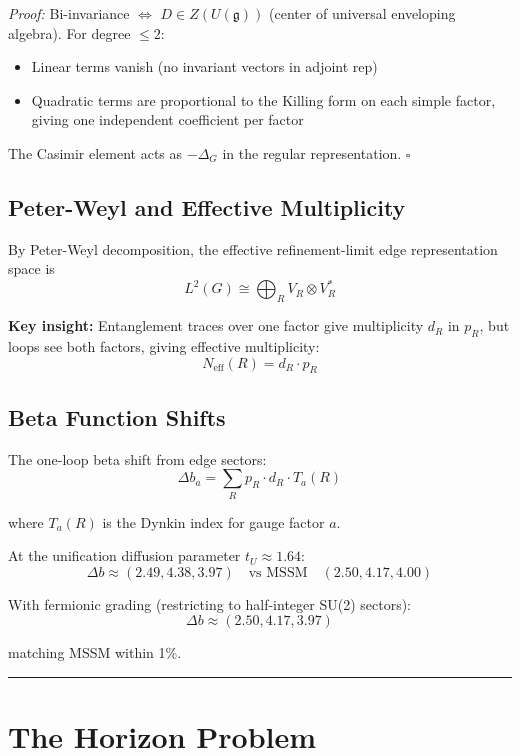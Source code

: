 \emph{Proof:} Bi-invariance \(\Leftrightarrow\) \(D \in Z(U(\mathfrak{g}))\) (center of universal enveloping algebra). For degree \(\leq 2\):

\begin{itemize}
\tightlist
\item
 Linear terms vanish (no invariant vectors in adjoint rep)
\item
 Quadratic terms are proportional to the Killing form on each simple factor, giving one independent coefficient per factor
\end{itemize}

The Casimir element acts as \(-\Delta_G\) in the regular representation. \(\square\)

\subsection{Peter-Weyl and Effective Multiplicity}\label{54-peter-weyl-and-effective-multiplicity}

By Peter-Weyl decomposition, the effective refinement-limit edge representation space is
\[L^2(G) \cong \bigoplus_R V_R \otimes V_R^*\]

\textbf{Key insight:} Entanglement traces over one factor give multiplicity \(d_R\) in \(p_R\), but loops see both factors, giving effective multiplicity: \[N_{\text{eff}}(R) = d_R \cdot p_R\]

\subsection{Beta Function Shifts}\label{55-beta-function-shifts}

The one-loop beta shift from edge sectors: \[\Delta b_a = \sum_R p_R \cdot d_R \cdot T_a(R)\]

where \(T_a(R)\) is the Dynkin index for gauge factor \(a\).

At the unification diffusion parameter \(t_U \approx 1.64\): \[\Delta b \approx (2.49, 4.38, 3.97) \quad \text{vs MSSM} \quad (2.50, 4.17, 4.00)\]

With fermionic grading (restricting to half-integer SU(2) sectors): \[\Delta b \approx (2.50, 4.17, 3.97)\]

matching MSSM within 1\%.

\begin{center}\rule{0.5\linewidth}{0.5pt}\end{center}

\section{The Horizon Problem}\label{6-the-horizon-problem}

